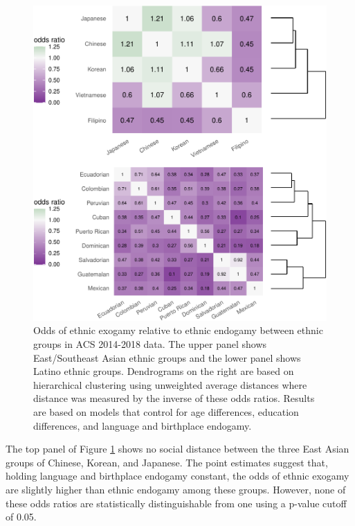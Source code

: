 \documentclass[11pt,]{article}
\begin{document}
\begin{figure}
\centering
\includegraphics{main_files/figure-latex/ethnic-heat-map-1.pdf}
\caption{\label{fig:ethnic-heat-map}Odds of ethnic exogamy relative to ethnic endogamy between ethnic groups in ACS 2014-2018 data. The upper panel shows East/Southeast Asian ethnic groups and the lower panel shows Latino ethnic groups. Dendrograms on the right are based on hierarchical clustering using unweighted average distances where distance was measured by the inverse of these odds ratios. Results are based on models that control for age differences, education differences, and language and birthplace endogamy.}
\end{figure}

The top panel of Figure \ref{fig:ethnic-heat-map} shows no social distance between the three East Asian groups of Chinese, Korean, and Japanese. The point estimates suggest that, holding language and birthplace endogamy constant, the odds of ethnic exogamy are slightly higher than ethnic endogamy among these groups. However, none of these odds ratios are statistically distinguishable from one using a p-value cutoff of 0.05.
\end{document}
